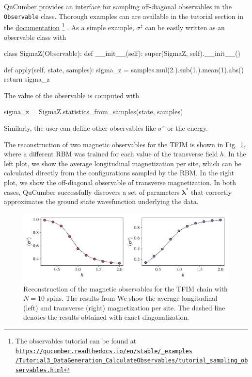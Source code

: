 \documentclass[submission, Phys, hidelnks]{SciPost}
\begin{document}
QuCumber provides an interface for sampling off-diagonal observables in the \verb|Observable| class. Thorough examples can are available in the tutorial section in the \href{https://qucumber.readthedocs.io/en/stable/}{documentation}
\footnote{The observables tutorial can be found at 
    \href{https://qucumber.readthedocs.io/en/stable/\_examples/Tutorial3\_DataGeneration\_CalculateObservables/tutorial\_sampling\_observables.html
}{\texttt{https://qucumber.readthedocs.io/en/stable/\_examples\\/Tutorial3\_DataGeneration\_CalculateObservables/tutorial\_sampling\_observables.html}}
}
. As a simple example, $\sigma^z$ can be easily written as an observable class with
\begin{python}
class SigmaZ(Observable):
    def __init__(self):
        super(SigmaZ, self).__init__()

    def apply(self, state, samples):
        sigma_z = samples.mul(2.).sub(1.).mean(1).abs()
        return sigma_z
\end{python}
The value of the observable is computed with 
\begin{python}
sigma_z = SigmaZ.statistics_from_samples(state, samples)
\end{python}
Similarly, the user can define other observables like $\sigma^x$ or the energy. 

The reconstruction of two magnetic observables for the TFIM is shown in Fig.~\ref{tfim_magn}, where a different RBM was trained for each value of the transverse field $h$. In the left plot, we show the average longitudinal magnetization per site, which can be calculated directly from the configurations sampled by the RBM. In the right plot, we show the off-diagonal observable of transverse magnetization. In both cases, QuCumber successfully discovers a set of parameters $\bm{\lambda}^*$ that correctly approximates the ground state wavefunction underlying the data.

\begin{figure}[htb]
    \centering{}
    \includegraphics[width=\columnwidth]{plots/obs.pdf}
    \caption{\label{tfim_magn} Reconstruction of the magnetic observables for the TFIM chain with $N=10$ spins. The results from We show the average longitudinal (left) and transverse (right) magnetization per site. The dashed line denotes the results obtained with exact diagonalization.}
\end{figure}
\end{document}
